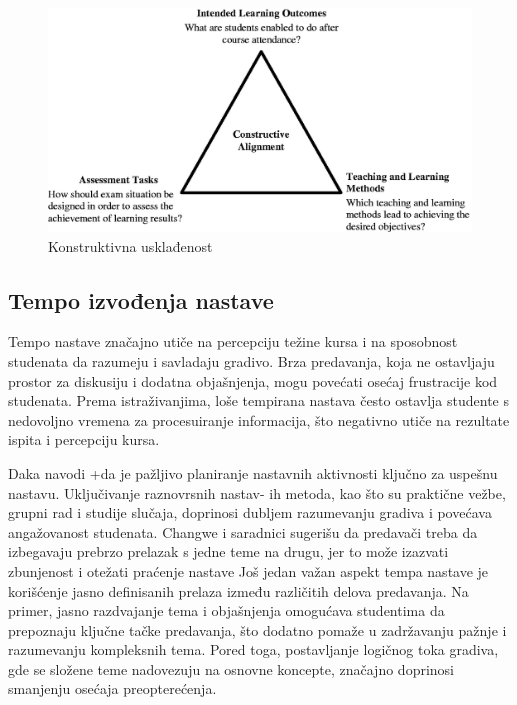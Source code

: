 \documentclass[a4paper]{article}
\begin{document}
\begin{figure}[h!]
\begin{center}
\includegraphics[scale=2]{constructive_alignment.jpeg}
\end{center}
\caption{Konstruktivna usklađenost}
\label{fig:konstruktivna_uskladjenost}
\end{figure}

\subsection{Tempo izvođenja nastave}
Tempo nastave značajno utiče na percepciju težine kursa i na sposobnost studenata da
razumeju i savladaju gradivo. Brza predavanja, koja ne ostavljaju prostor za diskusiju i
dodatna objašnjenja, mogu povećati osećaj frustracije kod studenata. Prema istraživanjima,
loše tempirana nastava često ostavlja studente s nedovoljno vremena za procesuiranje
informacija, što negativno utiče na rezultate ispita i percepciju kursa.

Daka \cite{daka2020exploration} navodi +da je pažljivo planiranje nastavnih aktivnosti ključno za uspešnu
nastavu. Uključivanje raznovrsnih nastav-
ih metoda, kao što su praktične vežbe, grupni rad i
studije slučaja, doprinosi dubljem razumevanju gradiva i povećava angažovanost studenata.
Changwe i saradnici \cite{daka2020exploration} sugerišu da predavači treba da izbegavaju prebrzo prelazak s
jedne teme na drugu, jer to može izazvati zbunjenost i otežati praćenje nastave
Još jedan važan aspekt tempa nastave je korišćenje jasno definisanih prelaza između
različitih delova predavanja. Na primer, jasno razdvajanje tema i objašnjenja omogućava
studentima da prepoznaju ključne tačke predavanja, što dodatno pomaže u zadržavanju
pažnje i razumevanju kompleksnih tema. Pored toga, postavljanje logičnog toka gradiva, gde
se složene teme nadovezuju na osnovne koncepte, značajno doprinosi smanjenju osećaja
preopterećenja.
\end{document}
